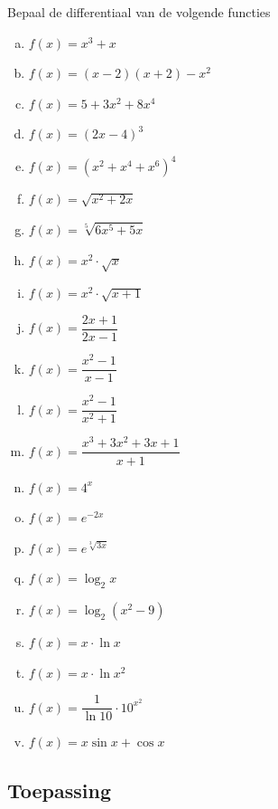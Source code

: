 \documentclass[a4paper,12pt, twoside]{article}
\begin{document}
\begin{oefening}
Bepaal de differentiaal van de volgende functies
\begin{multicols}{2}
\begin{enumerate}[(a)]
  \itemsep.5em
  \item $\displaystyle f(x)=x^3+x$
  \item $\displaystyle f(x)=(x-2)(x+2)-x^2$
  \item $\displaystyle f(x)=5+3x^2+8x^4$
  \item $\displaystyle f(x)=\left(2x-4\right)^3$
  \item $\displaystyle f(x)=\left(x^2+x^4+x^6\right)^4$
  \item $\displaystyle f(x)=\sqrt{x^2+2x}$
  \item $\displaystyle f(x)=\sqrt[5]{6x^5+5x}$
  \item $\displaystyle f(x)=x^2\cdot\sqrt{x}$
  \item $\displaystyle f(x)=x^2\cdot\sqrt{x+1}$
  \item $\displaystyle f(x)=\dfrac{2x+1}{2x-1}$
  \item $\displaystyle f(x)=\dfrac{x^2-1}{x-1}$
  \item $\displaystyle f(x)=\dfrac{x^2-1}{x^2+1}$
  \item $\displaystyle f(x)=\dfrac{x^3+3x^2+3x+1}{x+1}$
  \item $\displaystyle f(x)=4^{x}$
  \item $\displaystyle f(x)=e^{-2x}$
  \item $\displaystyle f(x)=e^{\sqrt[3]{3x}}$
  \item $\displaystyle f(x)=\log_2 x$
  \item $\displaystyle f(x)=\log_2 (x^2-9)$
  \item $\displaystyle f(x)=x\cdot \ln x$
  \item $\displaystyle f(x)=x\cdot \ln x^2$
  \item $\displaystyle f(x)=\dfrac{1}{\ln 10}\cdot 10^{x^2}$
  \item $\displaystyle f(x)=x\sin x + \cos x$
\end{enumerate}
\end{multicols}
\end{oefening}



\subsection{Toepassing}
\end{document}
